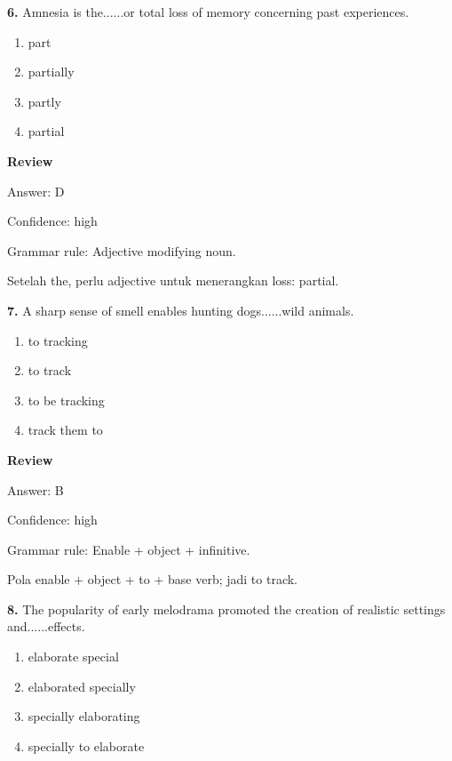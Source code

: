 \documentclass[12pt]{article}
\begin{document}
\endgroup
\par
\vspace{0.25\baselineskip}
\noindent\textbf{6.} Amnesia is the......or total loss of memory concerning past experiences.
\begin{enumerate}[label=(\Alph*),leftmargin=*,itemsep=0.2em]
\item part
\item partially
\item partly
\item partial
\end{enumerate}
\par
\begingroup
\setlength{\parskip}{0pt}
\setlength{\parindent}{0pt}
\textbf{Review}\par
Answer: D\par
Confidence: high\par
Grammar rule: Adjective modifying noun.\par
Setelah the, perlu adjective untuk menerangkan loss: partial.\par
\endgroup
\par
\vspace{0.25\baselineskip}
\noindent\textbf{7.} A sharp sense of smell enables hunting dogs......wild animals.
\begin{enumerate}[label=(\Alph*),leftmargin=*,itemsep=0.2em]
\item to tracking
\item to track
\item to be tracking
\item track them to
\end{enumerate}
\par
\begingroup
\setlength{\parskip}{0pt}
\setlength{\parindent}{0pt}
\textbf{Review}\par
Answer: B\par
Confidence: high\par
Grammar rule: Enable + object + infinitive.\par
Pola enable + object + to + base verb; jadi to track.\par
\endgroup
\par
\vspace{0.25\baselineskip}
\noindent\textbf{8.} The popularity of early melodrama promoted the creation of realistic settings and......effects.
\begin{enumerate}[label=(\Alph*),leftmargin=*,itemsep=0.2em]
\item elaborate special
\item elaborated specially
\item specially elaborating
\item specially to elaborate
\end{enumerate}
\end{document}
